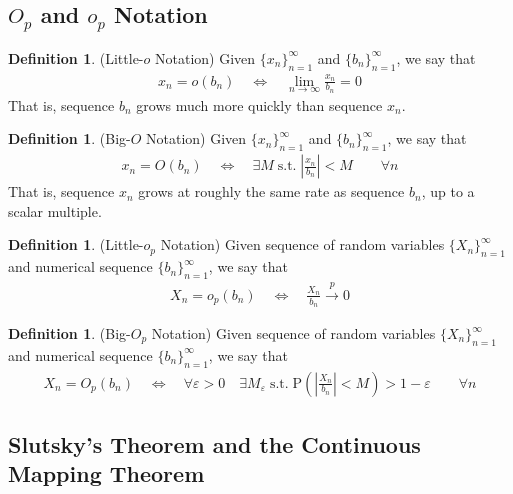 \documentclass[12pt]{article}
\theoremstyle{plain}
\theoremstyle{definition}
\newtheorem{defn}[thm]{Definition}
\theoremstyle{remark}
\newcommand{\limn}{\lim_{n\rightarrow\infty}}
\newcommand{\Prb}{\mathrm{P}}
\newcommand{\pto}{\xrightarrow{p}}
\begin{document}
\subsection{$O_p$ and $o_p$ Notation}

\begin{defn}(Little-$o$ Notation)
Given $\{x_n\}_{n=1}^\infty$ and $\{b_n\}_{n=1}^\infty$, we say that
\begin{align*}
  x_n = o(b_n)
  \quad \iff \quad
  \limn \frac{x_n}{b_n} = 0
\end{align*}
That is, sequence $b_n$ grows much more quickly than sequence $x_n$.
\end{defn}

\begin{defn}(Big-$O$ Notation)
Given $\{x_n\}_{n=1}^\infty$ and $\{b_n\}_{n=1}^\infty$, we say that
\begin{align*}
  x_n = O(b_n)
  \quad \iff \quad
  \exists M \; \text{s.t.} \;
  \left\lvert
  \frac{x_n}{b_n}
  \right\rvert
  < M
  \qquad \forall n
\end{align*}
That is, sequence $x_n$ grows at roughly the same rate as sequence
$b_n$, up to a scalar multiple.
\end{defn}

\begin{defn}(Little-$o_p$ Notation)
Given sequence of random variables $\{X_n\}_{n=1}^\infty$ and numerical
sequence $\{b_n\}_{n=1}^\infty$, we say that
\begin{align*}
  X_n = o_p(b_n)
  \quad \iff \quad
  \frac{X_n}{b_n} \pto 0
\end{align*}
\end{defn}

\begin{defn}(Big-$O_p$ Notation)
Given sequence of random variables $\{X_n\}_{n=1}^\infty$ and
numerical sequence $\{b_n\}_{n=1}^\infty$, we say that
\begin{align*}
  X_n = O_p(b_n)
  \quad \iff \quad
  \forall \varepsilon>0 \quad
  \exists M_\varepsilon
  \; \text{s.t.} \;
  \Prb\left(
  \left\lvert
  \frac{X_n}{b_n}
  \right\rvert
   < M\right)
  > 1- \varepsilon
  \qquad \forall n
\end{align*}
\end{defn}

\clearpage
\subsection{Slutsky's Theorem and the Continuous Mapping Theorem}
\end{document}
